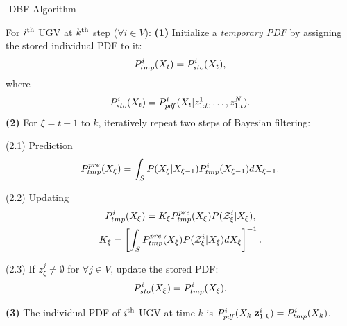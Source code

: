 	\begin{algorithm}
		\caption{\proto-DBF Algorithm}\label{alg:lifo-dbf}
		\begin{algorithmic}
			\State For $i^\text{th}$ UGV at $k^\text{th}$ step ($\forall i\in V$):
			\State\textbf{(1)} Initialize a \textit{temporary PDF} by assigning the stored individual PDF to it:
			\small\begin{equation*}
			P^i_{tmp}(X_{t})= P^i_{sto}(X_t),
			\end{equation*}\normalsize		
			where %
			\small\begin{equation*}
			P^i_{sto}(X_t) = P^i_{pdf}(X_{t}|z^1_{1:t},\dots,z^N_{1:t}).
			\end{equation*}\normalsize	
			\State\textbf{(2)} For $\xi=t+1$ to $k$, iteratively repeat two steps of Bayesian filtering:
			
			\State(2.1) Prediction 
			\small\begin{equation*}
			P_{tmp}^{pre}(X_{\xi})=\int_{S} P(X_{\xi}|X_{\xi-1})P^i_{tmp}(X_{\xi-1})dX_{\xi-1}.
			\end{equation*} \normalsize
			
			\State(2.2) Updating
			\small\begin{gather*}
			P^i_{tmp}(X_{\xi})=K_{\xi} P_{tmp}^{pre}(X_{\xi})P(\mathcal{Z}^i_{\xi}|X_{\xi}),\\
			K_{\xi}=\left[\int_S P_{tmp}^{pre}(X_{\xi})P(\mathcal{Z}^i_{\xi}|X_{\xi})dX_{\xi}\right]^{-1}.
			\end{gather*} \normalsize
			
			\State(2.3)
			If $z^j_{\xi}\neq\emptyset$ for $\forall j\in V$, update the stored PDF:
			\small\begin{equation*}
			P^i_{sto}(X_{\xi})=P^i_{tmp}(X_{\xi}).
			\end{equation*}\normalsize
			
			\State\textbf{(3)} The individual PDF of $i^\text{th}$ UGV at time $k$ is
			$P^i_{pdf}(X_{k}|\mathbf{z}^{i}_{1:k})=P^i_{tmp}(X_k)$.		
		\end{algorithmic}
	\end{algorithm}
	
